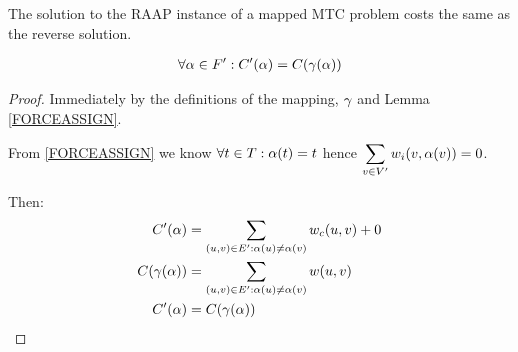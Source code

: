 \begin{lemma}
\label{REVERSECOST}
The solution to the RAAP instance of a mapped MTC problem costs the same as the reverse solution.

\begin{align}
	\nonumber \forall \alpha \in F' : C'(\alpha) = C(\gamma(\alpha))
\end{align}
\end{lemma}
\begin{proof}
Immediately by the definitions of the mapping, $\gamma$ and Lemma \ref{FORCEASSIGN}.

From \ref{FORCEASSIGN} we know $\forall t \in T : \alpha(t) = t$ hence $\displaystyle\sum\limits_{v \in V'} w_i(v, \alpha(v)) = 0$.

Then:
\begin{align}
	\nonumber C'(\alpha) & = \displaystyle\sum\limits_{(u,v) \in E' : \alpha(u) \neq \alpha(v)} w_c(u,v) + 0 \\
	\nonumber C(\gamma(\alpha)) & = \displaystyle\sum\limits_{(u,v) \in E' : \alpha(u) \neq \alpha(v)} w(u,v) \\
	\nonumber C'(\alpha) & = C(\gamma(\alpha))
\end{align}
\end{proof}

